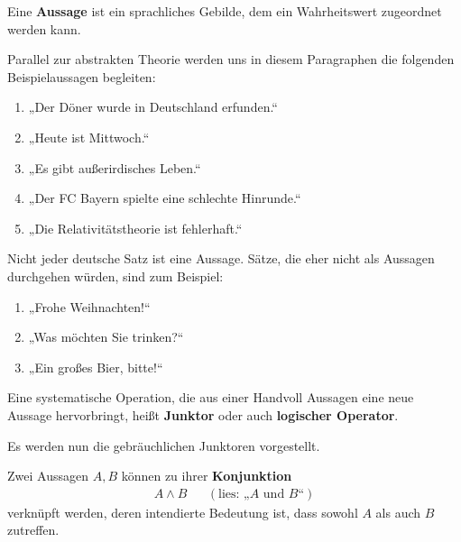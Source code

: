 \begin{defin}[Aussage] \label{def:aussage}
    Eine \textbf{Aussage} ist ein sprachliches Gebilde, dem ein Wahrheitswert zugeordnet werden kann.
\end{defin}
	

\begin{bsp}
    Parallel zur abstrakten Theorie werden uns in diesem Paragraphen die folgenden Beispielaussagen begleiten:
    \begin{enumerate}[label={$B_{\arabic*}:=$}, labelindent=1.5em, leftmargin=*, series=propbsp]
        \item „Der Döner wurde in Deutschland erfunden.“
        \item „Heute ist Mittwoch.“
        \item „Es gibt außerirdisches Leben.“
        \item „Der FC Bayern spielte eine schlechte Hinrunde.“
        \item „Die Relativitätstheorie ist fehlerhaft.“
    \end{enumerate}
    Nicht jeder deutsche Satz ist eine Aussage. Sätze, die eher nicht als Aussagen durchgehen würden, sind zum Beispiel: \quad
    \begin{enumerate}[resume*]
        \item[] „Frohe Weihnachten!“
        \item[] „Was möchten Sie trinken?“
        \item[] „Ein großes Bier, bitte!“
    \end{enumerate}
\end{bsp}


\begin{defin}[Junktor] 
    Eine systematische Operation, die aus einer Handvoll Aussagen eine neue Aussage hervorbringt, heißt \textbf{Junktor} oder auch \textbf{logischer Operator}.
\end{defin}


Es werden nun die gebräuchlichen Junktoren vorgestellt.


\begin{defin} 
    Zwei Aussagen $A,B$ können zu ihrer \textbf{Konjunktion}
    \begin{align*}
        A\land B && (\text{lies: „$A$ und $B$“})
    \end{align*}
    verknüpft werden, deren intendierte Bedeutung ist, dass sowohl $A$ als auch $B$ zutreffen.
\end{defin}


